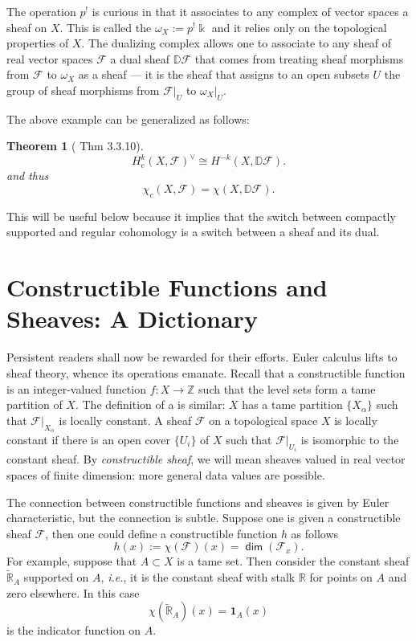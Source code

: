 \documentclass{psapm-l}
\newtheorem{theorem}{Theorem}[section]
\theoremstyle{definition}
\theoremstyle{remark}
\numberwithin{equation}{section}
\begin{document}
The operation $p^!$ is curious in that it associates to any complex of vector spaces a sheaf on $X$. This is called the {{}} $\omega_X:=p^!{{\Bbbk}}$ and it relies only on the topological properties of $X$. The dualizing complex allows one to associate to any sheaf of real vector spaces ${{\mathcal F}}$ a dual sheaf ${{\mathbb{D}}}{{\mathcal F}}$ that comes from treating sheaf morphisms from ${{\mathcal F}}$ to $\omega_X$ as a sheaf --- it is the sheaf that assigns to an open subsets $U$ the group of sheaf morphisms from ${{\mathcal F}}|_U$ to $\omega_X|_U$.

The above example can be generalized as follows:
\begin{theorem}[\cite{Dimca} Thm 3.3.10]
\begin{equation}
       H_c^k(X,{{\mathcal F}})^\vee\cong H^{-k}(X,{{\mathbb{D}}}{{\mathcal F}}).
\end{equation}
and thus
\begin{equation}
       \chi_c(X,{{\mathcal F}})=\chi(X,{{\mathbb{D}}}{{\mathcal F}}).
\end{equation}
\end{theorem}
This will be useful below because it implies that the switch between compactly supported and regular cohomology is a switch between a sheaf and its dual.

\section{Constructible Functions and Sheaves: A Dictionary}
\label{sec:dictionary}

Persistent readers shall now be rewarded for their efforts. Euler calculus lifts to sheaf theory, whence its operations emanate. Recall that a constructible function is an integer-valued function $f\colon X\to{{\mathbb Z}}$ such that the level sets form a tame partition of $X$. The definition of a {{}} is similar: $X$ has a tame partition $\{X_{\alpha}\}$ such that ${{\mathcal F}}|_{X_{\alpha}}$ is locally constant. A sheaf ${{\mathcal F}}$ on a topological space $X$ is locally constant if there is an open cover $\{U_i\}$ of $X$ such that ${{\mathcal F}}|_{U_i}$ is isomorphic to the constant sheaf. By {\em constructible sheaf}, we will mean sheaves valued in real vector spaces of finite dimension: more general data values are possible.

The connection between constructible functions and sheaves is given by Euler characteristic, but the connection is subtle. Suppose one is given a constructible sheaf ${{\mathcal F}}$, then one could define a constructible function $h$ as follows
\[
	h(x):=\chi({{\mathcal F}})(x)={{{\operatorname{\mathsf{{dim}}}}}} ({{\mathcal F}}_x).
\]
For example, suppose that $A\subset X$ is a tame set. Then consider the constant sheaf $\widetilde{{\mathbb R}}_A$ supported on $A$, {{\em i.e.}}, it is the constant sheaf with stalk ${{\mathbb R}}$ for points on $A$ and zero elsewhere. In this case
\[
	\chi(\widetilde{{\mathbb R}}_A)(x)=\mathbf{1}_A(x)
\]
is the indicator function on $A$.
\end{document}
